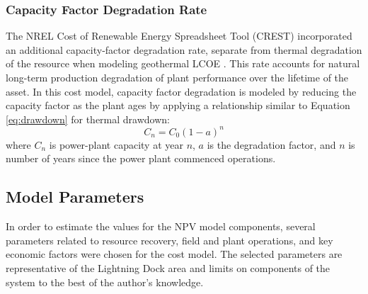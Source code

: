 \subsubsection{Capacity Factor Degradation Rate}\label{ch4:degrade_rate}

The NREL Cost of Renewable Energy Spreadsheet Tool (CREST) incorporated an additional capacity-factor degradation rate, separate from thermal degradation of the resource when modeling geothermal LCOE \citep{gifford_crest_2013}. This rate accounts for natural long-term production degradation of plant performance over the lifetime of the asset. In this cost model, capacity factor degradation is modeled by reducing the capacity factor as the plant ages by applying a relationship similar to Equation \ref{eq:drawdown} for thermal drawdown:
\begin{equation}
    \label{eq:degradation}
    C_n = C_0 %
    (1-a)^n
\end{equation}
where $C_n$ is power-plant capacity at year $n$, $a$ is the degradation factor, and $n$ is number of years since the power plant commenced operations.

\subsection{Model Parameters}\label{ch4:cm_params}

In order to estimate the values for the NPV model components, several parameters related to resource recovery, field and plant operations, and key economic factors were chosen for the cost model. The selected parameters are representative of the Lightning Dock area and limits on components of the system to the best of the author's knowledge.

